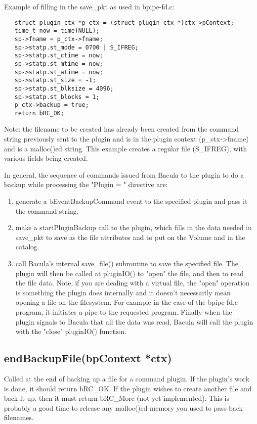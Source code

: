 Example of filling in the save\_pkt as used in bpipe-fd.c:

\begin{verbatim}
   struct plugin_ctx *p_ctx = (struct plugin_ctx *)ctx->pContext;
   time_t now = time(NULL);
   sp->fname = p_ctx->fname;
   sp->statp.st_mode = 0700 | S_IFREG;
   sp->statp.st_ctime = now;
   sp->statp.st_mtime = now;
   sp->statp.st_atime = now;
   sp->statp.st_size = -1;
   sp->statp.st_blksize = 4096;
   sp->statp.st_blocks = 1;
   p_ctx->backup = true;
   return bRC_OK; 
\end{verbatim}

Note: the filename to be created has already been created from the 
command string previously sent to the plugin and is in the plugin 
context (p\_ctx->fname) and is a malloc()ed string.  This example
creates a regular file (S\_IFREG), with various fields being created.

In general, the sequence of commands issued from Bacula to the plugin
to do a backup while processing the "Plugin = " directive are:

\begin{enumerate}
 \item generate a bEventBackupCommand event to the specified plugin
       and pass it the command string.
 \item make a startPluginBackup call to the plugin, which
       fills in the data needed in save\_pkt to save as the file
       attributes and to put on the Volume and in the catalog.
 \item call Bacula's internal save\_file() subroutine to save the specified
       file.  The plugin will then be called at pluginIO() to "open"
       the file, and then to read the file data.
       Note, if you are dealing with a virtual file, the "open" operation
       is something the plugin does internally and it doesn't necessarily
       mean opening a file on the filesystem.  For example in the case of
       the bpipe-fd.c program, it initiates a pipe to the requested program.
       Finally when the plugin signals to Bacula that all the data was read,
       Bacula will call the plugin with the "close" pluginIO() function.
\end{enumerate}


\subsection{endBackupFile(bpContext *ctx)}
Called at the end of backing up a file for a command plugin.  If the plugin's
work is done, it should return bRC\_OK.  If the plugin wishes to create another
file and back it up, then it must return bRC\_More (not yet implemented).  This
is probably a good time to release any malloc()ed memory you used to pass back
filenames.

